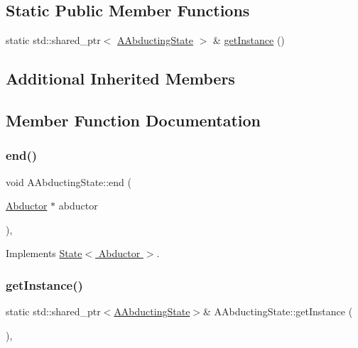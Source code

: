 \subsection*{Static Public Member Functions}
\begin{DoxyCompactItemize}
\item 
static std\+::shared\+\_\+ptr$<$ \hyperlink{class_a_abducting_state}{A\+Abducting\+State} $>$ \& \hyperlink{class_a_abducting_state_a0843d5645fe863959f454a9497cc32ab}{get\+Instance} ()
\end{DoxyCompactItemize}
\subsection*{Additional Inherited Members}


\subsection{Member Function Documentation}
\mbox{\label{class_a_abducting_state_a618a6c11d2dc823b11161ff3a0c88ef8}} 
\subsubsection{\texorpdfstring{end()}{end()}}
{\footnotesize\ttfamily void A\+Abducting\+State\+::end (\begin{DoxyParamCaption}\item[{\hyperlink{class_abductor}{Abductor} $\ast$}]{abductor }\end{DoxyParamCaption})\hspace{0.3cm}{\ttfamily [override]}, {\ttfamily [virtual]}}



Implements \hyperlink{class_state_a97d058722f988c008e912a0e5ec879b3}{State$<$ Abductor $>$}.

\mbox{\label{class_a_abducting_state_a0843d5645fe863959f454a9497cc32ab}} 
\subsubsection{\texorpdfstring{get\+Instance()}{getInstance()}}
{\footnotesize\ttfamily static std\+::shared\+\_\+ptr$<$\hyperlink{class_a_abducting_state}{A\+Abducting\+State}$>$\& A\+Abducting\+State\+::get\+Instance (\begin{DoxyParamCaption}{ }\end{DoxyParamCaption})\hspace{0.3cm}{\ttfamily [inline]}, {\ttfamily [static]}}

